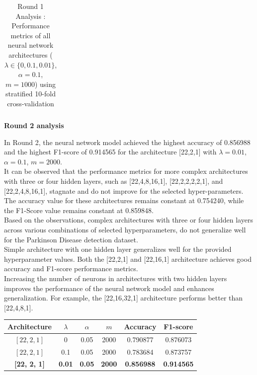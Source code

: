 \documentclass{article}
\begin{document}
\begin{enumerate}
\begin{table}[H]
\begin{tabular}{|c|c|c|c|c|c|}
\end{tabular}
\caption{Round 1 Analysis : Performance metrics of all neural network architectures ($\lambda \in \{0, 0.1, 0.01\}$, $\alpha = 0.1$, $m = 1000$) using stratified 10-fold cross-validation}
\end{table}

\textbf{Round 2 analysis}

In Round 2, the neural network model achieved the highest accuracy of 0.856988 and the highest F1-score of 0.914565 for the architecture [22,2,1] with $\lambda = 0.01$, $\alpha = 0.1$, $m = 2000$. \\

It can be observed that the performance metrics for more complex architectures with three or four hidden layers, such as [22,4,8,16,1], [22,2,2,2,2,1], and [22,2,4,8,16,1], stagnate and do not improve for the selected hyper-parameters. The accuracy value for these architectures remains constant at 0.754240, while the F1-Score value remains constant at 0.859848.\\

Based on the observations, complex architectures with three or four hidden layers across various combinations of selected hyperparameters, do not generalize well for the Parkinson Disease detection dataset. \\

Simple architecture with one hidden layer generalizes well for the provided hyperparameter values. Both the [22,2,1] and [22,16,1] architecture achieves good accuracy and F1-score performance metrics.\\

Increasing the number of neurons in architectures with two hidden layers improves the performance of the neural network model and enhances generalization. For example, the [22,16,32,1] architecture performs better than [22,4,8,1].

\begin{table}[H]
\centering
\large
\renewcommand{\arraystretch}{1.3}
\setlength{\tabcolsep}{8pt}

\begin{tabular}{|c|c|c|c|c|c|}
\hline
\textbf{Architecture} & \textbf{$\lambda$} & \textbf{$\alpha$} & \textbf{$m$} & \textbf{Accuracy} & \textbf{F1-score} \\
\hline

$[22, 2, 1]$ & 0    & 0.05 & 2000 & 0.790877 & 0.876073 \\ \hline
$[22, 2, 1]$ & 0.1  & 0.05 & 2000 & 0.783684 & 0.873757 \\ \hline
\textbf{[22, 2, 1]} & \textbf{0.01} & \textbf{0.05} & \textbf{2000} & \textbf{0.856988} & \textbf{0.914565} \\ \hline


\end{tabular}
\end{table}
\end{enumerate}
\end{document}
